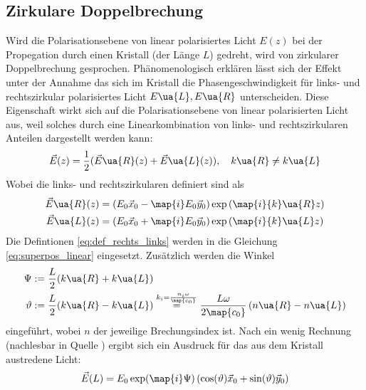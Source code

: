\subsection{Zirkulare Doppelbrechung}
Wird die Polarisationsebene von linear polarisiertes Licht $E(z)$ bei der Propegation
durch einen Kristall (der Länge $L$) gedreht, wird von zirkularer Doppelbrechung gesprochen.
Phänomenologisch erklären lässt sich der Effekt unter der Annahme das sich im
Kristall die Phasengeschwindigkeit für links- und rechtszirkular polarisiertes
Licht $E\ua{L}, E\ua{R}$ unterscheiden. Diese Eigenschaft wirkt sich auf die Polarisationsebene
von linear polarisierten Licht aus, weil solches durch eine Linearkombination
von links- und rechtszirkularen Anteilen dargestellt werden kann:
\begin{equation}
  \label{eq:superpos_linear}
\vec{E}(z) = \frac{1}{2}( \vec{E}\ua{R}(z) + \vec{E}\ua{L}(z)), \quad k\ua{R}\neq k\ua{L}
\end{equation}
Wobei die links- und rechtszirkularen definiert sind als
\begin{align}
  \label{eq:def_rechts_links}
  \begin{aligned}
  \vec{E}\ua{R}(z) &= \left(E_0 \vec{x}_0 - \map{i}E_0\vec{y}_0\right)\exp\left(\map{i}{k}\ua{R}z\right)\\
  \vec{E}\ua{L}(z) &= \left(E_0 \vec{x}_0 + \map{i}E_0\vec{y}_0\right)\exp\left(\map{i}{k}\ua{L}z\right)
\end{aligned}
\end{align}
Die Defintionen \eqref{eq:def_rechts_links} werden in die Gleichung \eqref{eq:superpos_linear}
eingesetzt. Zusätzlich werden die Winkel
\begin{align}
  \label{eq:winkel}
  \begin{aligned}
    \Psi&:=\frac{L}{2}(k\ua{R}+k\ua{L}) \\
    \vartheta &:= \frac{L}{2}(k\ua{R}-k\ua{L}) \overset{k_i=\frac{n_i\omega}{\map{c_0}}}{=} \frac{L\omega}{2\map{c_0}}\left(n\ua{R}-n\ua{L}\right)
\end{aligned}
\end{align}
eingeführt, wobei $n$ der jeweilige Brechungsindex ist.
Nach ein wenig Rechnung (nachlesbar in Quelle \cite{anleitungv46}) ergibt sich ein
Ausdruck für das aus dem Kristall austredene Licht:
\begin{equation*}
  \vec{E}(L)=E_0 \exp(\map{i}\Psi)\left(\cos(\vartheta) \vec{x}_0 + \sin(\vartheta)\vec{y}_0\right)
\end{equation*}

